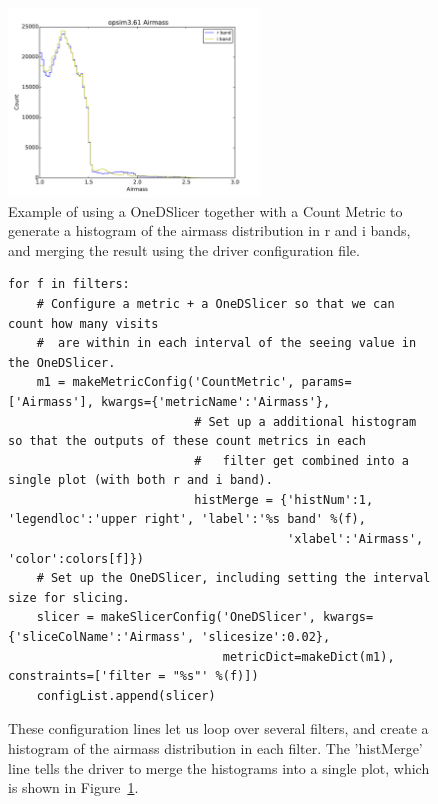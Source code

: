 \documentclass[]{spie}  %
\begin{document}
\begin{figure}
\centering
\includegraphics[height=5cm]{figures/opsim3_61__opsim3_61_Airmass_ONED_Histogram}
\caption[]
{ \label{fig:OneD}Example of using a OneDSlicer together with a Count
Metric to generate a histogram of the airmass distribution in r and i
bands, and merging the result using the driver configuration file. 
}
\end{figure}

\begin{figure}
\centering
\begin{lstlisting}[frame=single]
for f in filters:
    # Configure a metric + a OneDSlicer so that we can count how many visits 
    #  are within in each interval of the seeing value in the OneDSlicer. 
    m1 = makeMetricConfig('CountMetric', params=['Airmass'], kwargs={'metricName':'Airmass'},
                          # Set up a additional histogram so that the outputs of these count metrics in each
                          #   filter get combined into a single plot (with both r and i band). 
                          histMerge = {'histNum':1, 'legendloc':'upper right', 'label':'%s band' %(f),
                                       'xlabel':'Airmass', 'color':colors[f]})
    # Set up the OneDSlicer, including setting the interval size for slicing.
    slicer = makeSlicerConfig('OneDSlicer', kwargs={'sliceColName':'Airmass', 'slicesize':0.02},
                              metricDict=makeDict(m1), constraints=['filter = "%s"' %(f)])
    configList.append(slicer)
\end{lstlisting}
\caption[]
{\label{fig:oneDdriver}These configuration lines let us loop over
  several filters, and create a histogram of the airmass distribution
  in each filter. The 'histMerge' line tells the driver to merge the
  histograms into a single plot, which is shown in Figure~\ref{fig:OneD}.}
\end{figure}
\end{document}
